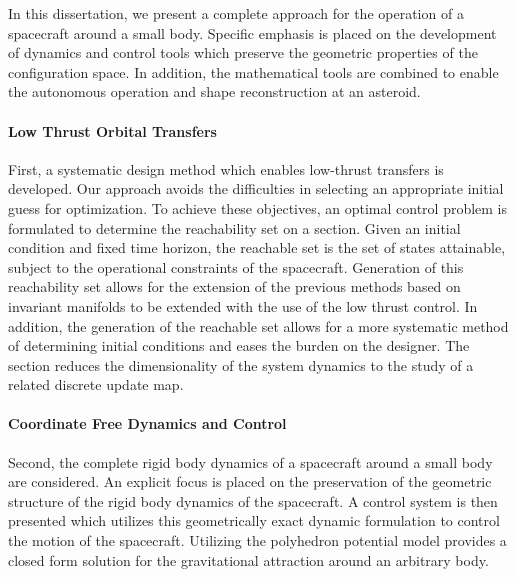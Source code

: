 In this dissertation, we present a complete approach for the operation of a spacecraft around a small body. 
Specific emphasis is placed on the development of dynamics and control tools which preserve the geometric properties of the configuration space. 
In addition, the mathematical tools are combined to enable the autonomous operation and shape reconstruction at an asteroid.

\paragraph{Low Thrust Orbital Transfers}
First, a systematic design method which enables low-thrust transfers is developed.
Our approach avoids the difficulties in selecting an appropriate initial guess for optimization.
To achieve these objectives, an optimal control problem is formulated to determine the reachability set on a \Poincare section.
Given an initial condition and fixed time horizon, the reachable set is the set of states attainable, subject to the operational constraints of the spacecraft. 
Generation of this reachability set allows for the extension of the previous methods based on invariant manifolds to be extended with the use of the low thrust control.
In addition, the generation of the reachable set allows for a more systematic method of determining initial conditions and eases the burden on the designer. 
The \Poincare section reduces the dimensionality of the system dynamics to the study of a related discrete update map.  

\paragraph{Coordinate Free Dynamics and Control}
Second, the complete rigid body dynamics of a spacecraft around a small body are considered.
An explicit focus is placed on the preservation of the geometric structure of the rigid body dynamics of the spacecraft.
A control system is then presented which utilizes this geometrically exact dynamic formulation to control the motion of the spacecraft. 
Utilizing the polyhedron potential model provides a closed form solution for the gravitational attraction around an arbitrary body. 

